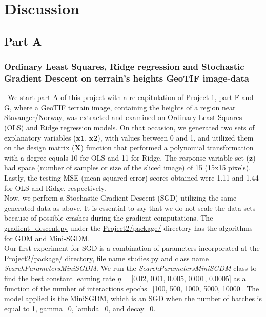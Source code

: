 \section{Discussion}
\label{chap:Discussion}

\subsection{Part A}
\label{chap:PartA}

\subsubsection{Ordinary Least Squares, Ridge regression and Stochastic Gradient Descent on terrain's heights GeoTIF image-data}
\label{chap:Ordinary Least Squares, Ridge regression and Stochastic Gradient Descent on terrain's heights GeoTIF image-data}

\quad \, We start part A of this project with a re-capitulation of \href{https://github.com/fabiorodp/UiO-FYS-STK4155/blob/master/Project1}{Project 1}, part F and G, where a GeoTIF terrain image, containing the heights of a region near Stavanger/Norway, was extracted and examined on Ordinary Least Squares (OLS) and Ridge regression models. On that occasion, we generated two sets of explanatory variables ($\boldsymbol{x1}$, $\boldsymbol{x2}$), with values between 0 and 1, and utilized them on the design matrix ($\boldsymbol{X}$) function that performed a polynomial transformation with a degree equals 10 for OLS and 11 for Ridge. The response variable set ($\boldsymbol{z}$) had space (number of samples or size of the sliced image) of 15 (15x15 pixels). Lastly, the testing MSE (mean squared error) scores obtained were 1.11 and 1.44 for OLS and Ridge, respectively.\\

Now, we perform a Stochastic Gradient Descent (SGD) utilizing the same generated data as above. It is essential to say that we do not scale the data-sets because of possible crashes during the gradient computations. The \href{https://github.com/fabiorodp/UiO-FYS-STK4155/blob/master/Project2/package/gradient_descent.py}{gradient\_descent.py} under the \href{https://github.com/fabiorodp/UiO-FYS-STK4155/tree/master/Project2/package}{Project2/package/} directory has the algorithms for GDM and Mini-SGDM.\\

Our first experiment for SGD is a combination of parameters incorporated at the \href{https://github.com/fabiorodp/UiO-FYS-STK4155/tree/master/Project2/package}{Project2/package/} directory, file name \href{https://github.com/fabiorodp/UiO-FYS-STK4155/blob/master/Project2/package/studies.py}{studies.py} and class name \textit{SearchParametersMiniSGDM}. We run the \textit{SearchParametersMiniSGDM} class to find the best constant learning rate $\eta$ = [0.02, 0.01, 0.005, 0.001, 0.0005] as a function of the number of interactions epochs=[100, 500, 1000, 5000, 10000]. The model applied is the MiniSGDM, which is an SGD when the number of batches is equal to 1, gamma=0, lambda=0, and decay=0.\\

